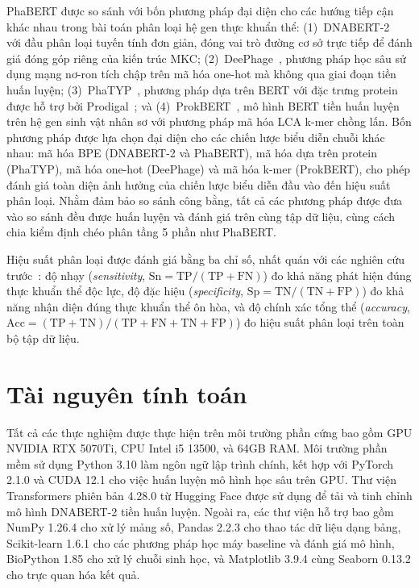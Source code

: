 PhaBERT được so sánh với bốn phương pháp đại diện cho các hướng tiếp cận khác nhau trong bài toán phân loại hệ gen thực khuẩn thể: (1)~DNABERT-2~\cite{zhou2023dnabert} với đầu phân loại tuyến tính đơn giản, đóng vai trò đường cơ sở trực tiếp để đánh giá đóng góp riêng của kiến trúc MKC; (2)~DeePhage~\cite{wu2021deephage}, phương pháp học sâu sử dụng mạng nơ-ron tích chập trên mã hóa one-hot mà không qua giai đoạn tiền huấn luyện; (3)~PhaTYP~\cite{shang2023phatyp}, phương pháp dựa trên BERT với đặc trưng protein được hỗ trợ bởi Prodigal~\cite{hyatt2010prodigal}; và (4)~ProkBERT~\cite{ligeti2024prokbert}, mô hình BERT tiền huấn luyện trên hệ gen sinh vật nhân sơ với phương pháp mã hóa LCA k-mer chồng lấn. Bốn phương pháp được lựa chọn đại diện cho các chiến lược biểu diễn chuỗi khác nhau: mã hóa BPE (DNABERT-2 và PhaBERT), mã hóa dựa trên protein (PhaTYP), mã hóa one-hot (DeePhage) và mã hóa k-mer (ProkBERT), cho phép đánh giá toàn diện ảnh hưởng của chiến lược biểu diễn đầu vào đến hiệu suất phân loại. Nhằm đảm bảo so sánh công bằng, tất cả các phương pháp được đưa vào so sánh đều được huấn luyện và đánh giá trên cùng tập dữ liệu, cùng cách chia kiểm định chéo phân tầng 5 phần như PhaBERT.

Hiệu suất phân loại được đánh giá bằng ba chỉ số, nhất quán với các nghiên cứu trước~\cite{wu2021deephage,shang2023phatyp}: độ nhạy (\textit{sensitivity}, $\text{Sn} = \text{TP}/(\text{TP}+\text{FN})$) đo khả năng phát hiện đúng thực khuẩn thể độc lực, độ đặc hiệu (\textit{specificity}, $\text{Sp} = \text{TN}/(\text{TN}+\text{FP})$) đo khả năng nhận diện đúng thực khuẩn thể ôn hòa, và độ chính xác tổng thể (\textit{accuracy}, $\text{Acc} = (\text{TP}+\text{TN})/(\text{TP}+\text{FN}+\text{TN}+\text{FP})$) đo hiệu suất phân loại trên toàn bộ tập dữ liệu.

\section{Tài nguyên tính toán}
\label{sec:tai_nguyen_tinh_toan}

Tất cả các thực nghiệm được thực hiện trên môi trường phần cứng bao gồm GPU NVIDIA RTX 5070Ti, CPU Intel i5 13500, và 64GB RAM. Môi trường phần mềm sử dụng Python 3.10 làm ngôn ngữ lập trình chính, kết hợp với PyTorch 2.1.0 và CUDA 12.1 cho việc huấn luyện mô hình học sâu trên GPU. Thư viện Transformers phiên bản 4.28.0 từ Hugging Face được sử dụng để tải và tinh chỉnh mô hình DNABERT-2 tiền huấn luyện. Ngoài ra, các thư viện hỗ trợ bao gồm NumPy 1.26.4 cho xử lý mảng số, Pandas 2.2.3 cho thao tác dữ liệu dạng bảng, Scikit-learn 1.6.1 cho các phương pháp học máy baseline và đánh giá mô hình, BioPython 1.85 cho xử lý chuỗi sinh học, và Matplotlib 3.9.4 cùng Seaborn 0.13.2 cho trực quan hóa kết quả.

